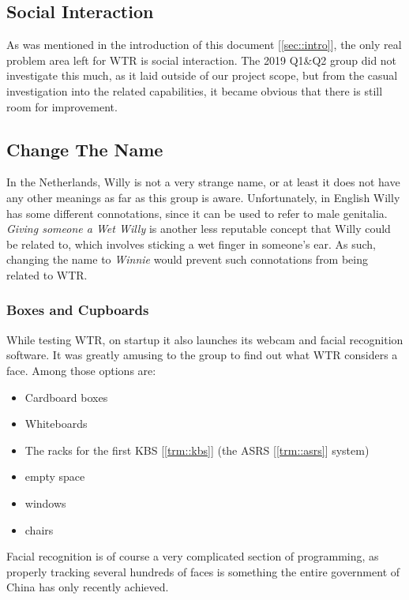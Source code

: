 \subsection{Social Interaction}
As was mentioned in the introduction of this document [\ref{sec::intro}], the only real problem area left for WTR is social interaction.
The 2019 Q1\&Q2 group did not investigate this much, as it laid outside of our project scope, but from the casual investigation into the related capabilities, it became obvious that there is still room for improvement.

\subsection{Change The Name}
In the Netherlands, Willy is not a very strange name, or at least it does not have any other meanings as far as this group is aware.
Unfortunately, in English Willy has some different connotations, since it can be used to refer to male genitalia.
\textit{Giving someone a Wet Willy} is another less reputable concept that Willy could be related to, which involves sticking a wet finger in someone's ear.
As such, changing the name to \textit{Winnie} would prevent such connotations from being related to WTR.

\subsubsection{Boxes and Cupboards}
While testing WTR, on startup it also launches its webcam and facial recognition software.
It was greatly amusing to the group to find out what WTR considers a face.
Among those options are:
\begin{itemize}
\item Cardboard boxes
\item Whiteboards
\item The racks for the first KBS [\ref{trm::kbs}] (the ASRS [\ref{trm::asrs}] system)
\item empty space
\item windows
\item chairs
\end{itemize}
Facial recognition is of course a very complicated section of programming, as properly tracking several hundreds of faces is something the entire government of China has only recently achieved.

\newpage
